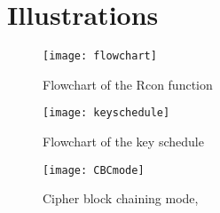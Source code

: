 \chapter{Illustrations} \label{app:fig}

\begin{figure}
  \begin{center}
    \texttt{[image: flowchart]}
  \end{center}
  \caption{Flowchart of the Rcon function}
  \label{img:rcon}
\end{figure}

\begin{figure}
  \texttt{[image: keyschedule]}
  \caption{Flowchart of the key schedule}
  \label{img:keysch}
\end{figure}

\begin{figure}
  \begin{center}
   \texttt{[image: CBCmode]}
  \end{center}
  \caption{Cipher block chaining mode, \citep{CBCmode:2014}}
  \label{img:CBCmode}
\end{figure}

